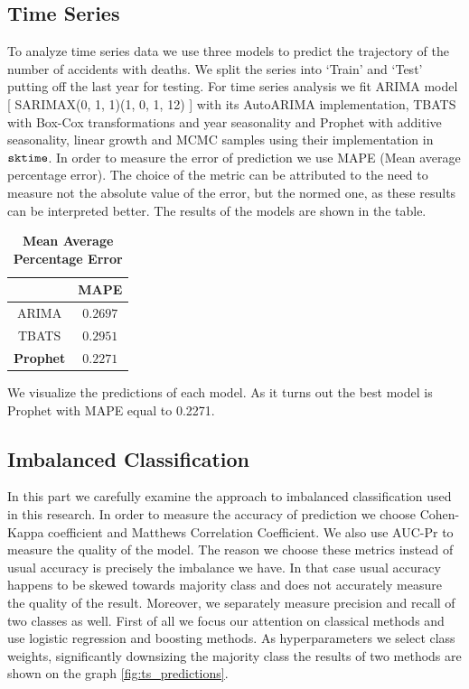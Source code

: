 \subsection{Time Series}

To analyze time series data we use three models to predict the trajectory of the number of accidents with deaths.
We split the series into ‘Train’ and ‘Test’ putting off the last year for testing.
For time series analysis we fit ARIMA model [ SARIMAX(0, 1, 1)(1, 0, 1, 12) ] with its AutoARIMA implementation,
TBATS with Box-Cox transformations and year seasonality and Prophet with additive seasonality,
linear growth and MCMC samples using their implementation in $\verb|sktime|$.
In order to measure the error of prediction we use MAPE (Mean average percentage error).
The choice of the metric can be attributed to the need to measure not the absolute value of the error, but the normed one,
as these results can be interpreted better. The results of the models are shown in the table. \\

\begin{table}[htpb]
	\centering
	\caption{\textbf{Mean Average Percentage Error}}
	\label{tab:mape}
	\begin{tabular}{|c|c|}
		\hline
		& MAPE \\
		\hline
		ARIMA & $0.2697$ \\
		TBATS	& $0.2951$ \\
		\textbf{Prophet}	& $0.2271$ \\ 
		\hline
	\end{tabular}
\end{table}
\noindent
We visualize the predictions of each model. As it turns out the best model is Prophet with MAPE equal to 0.2271.
\subsection{Imbalanced Classification}
In this part we carefully examine the approach to imbalanced classification used in this research.
In order to measure the accuracy of prediction we choose Cohen-Kappa coefficient and Matthews Correlation Coefficient.
We also use AUC-Pr to measure the quality of the model. The reason we choose these metrics instead of usual accuracy is precisely the imbalance we have.
In that case usual accuracy happens to be skewed towards majority class and does not accurately measure the quality of the result.
Moreover, we separately measure precision and recall of two classes as well.
First of all we focus our attention on classical methods and use logistic regression and boosting methods.
As hyperparameters we select class weights, significantly downsizing the majority class the results of two methods are shown on the graph
\ref{fig:ts_predictions}.

